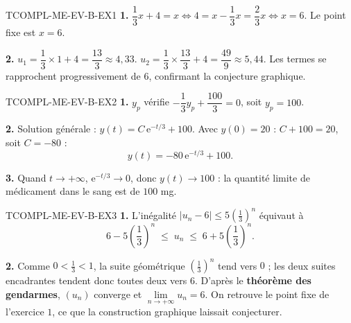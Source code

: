 %
%
\begin{corrige}{TCOMPL-ME-EV-B-EX1}
\textbf{1.} $\dfrac{1}{3}x+4 = x \iff 4 = x - \dfrac{1}{3}x = \dfrac{2}{3}x \iff x=6$. Le point fixe est $x=6$.

\textbf{2.} $u_1 = \dfrac{1}{3}\times1+4 = \dfrac{13}{3} \approx 4{,}33$. $u_2 = \dfrac{1}{3}\times\dfrac{13}{3}+4 = \dfrac{49}{9} \approx 5{,}44$. Les termes se rapprochent progressivement de $6$, confirmant la conjecture graphique.
\end{corrige}

\begin{corrige}{TCOMPL-ME-EV-B-EX2}
\textbf{1.} $y_p$ vérifie $-\dfrac{1}{3}y_p + \dfrac{100}{3} = 0$, soit $y_p = 100$.

\textbf{2.} Solution générale : $y(t) = C\,\mathrm{e}^{-t/3} + 100$. Avec $y(0)=20$ : $C+100=20$, soit $C=-80$ :
\[
  y(t) = -80\,\mathrm{e}^{-t/3} + 100.
\]

\textbf{3.} Quand $t\to+\infty$, $\mathrm{e}^{-t/3}\to0$, donc $y(t)\to100$ : la quantité limite de médicament dans le sang est de $100$ mg.
\end{corrige}

\begin{corrige}{TCOMPL-ME-EV-B-EX3}
\textbf{1.} L'inégalité $\left|u_n-6\right|\leq5\left(\frac13\right)^n$ équivaut à
\[
  6-5\left(\frac13\right)^n \;\leq\; u_n \;\leq\; 6+5\left(\frac13\right)^n .
\]

\textbf{2.} Comme $0<\frac13<1$, la suite géométrique $\left(\frac13\right)^n$ tend vers $0$ ; les deux suites encadrantes tendent donc toutes deux vers $6$. D'après le \textbf{théorème des gendarmes}, $(u_n)$ converge et $\lim\limits_{n\to+\infty}u_n=6$. On retrouve le point fixe de l'exercice $1$, ce que la construction graphique laissait conjecturer.
\end{corrige}
